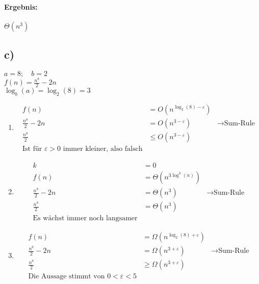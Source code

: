 \documentclass[12pt,letterpaper]{article}
\begin{document}
\paragraph{Ergebnis:}
$ \Theta(n^3)$

\subsection*{c)}
$a = 8;\quad b = 2$ \\
$f(n) =  \frac{n^8}{2} - 2n$ \\
$\log_b(a) = \log_2(8) = 3$
\begin{enumerate}
    \item \begin{align*}
              f(n)               & = O(n^{\log_2(8) - \varepsilon})                               \\
              \frac{n^8}{2} - 2n & = O(n^{3 - \varepsilon})         & \rightarrow \text{Sum-Rule} \\
              \frac{n^8}{2}      & \leq O(n^{3 - \varepsilon})                                    \\
              \text{Ist für } \varepsilon > 0 \text{ immer kleiner, also falsch}
          \end{align*}
    \item \begin{align*}
              k                  & = 0                                                    \\
              f(n)               & = \Theta(n^{3\log^k(n)})                               \\
              \frac{n^8}{2} - 2n & = \Theta(n^3)            & \rightarrow \text{Sum-Rule} \\
              \frac{n^8}{2}      & = \Theta(n^3)                                          \\
              \text{Es wächst immer noch langsamer}
          \end{align*}
    \item \begin{align*}
              f(n)               & = \Omega(n^{\log_2(8) + \varepsilon})                               \\
              \frac{n^8}{2} - 2n & = \Omega(n^{3 + \varepsilon})         & \rightarrow \text{Sum-Rule} \\
              \frac{n^8}{2}      & \geq \Omega(n^{3 + \varepsilon})                                    \\
              \text{Die Aussage stimmt von } 0 < \varepsilon < 5
          \end{align*}
\end{enumerate}
\end{document}
